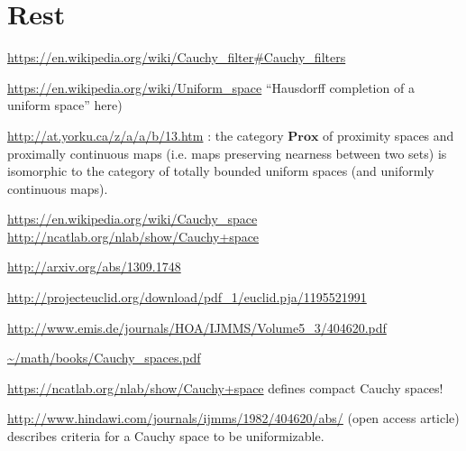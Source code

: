 \section{Rest}

\url{https://en.wikipedia.org/wiki/Cauchy\_filter\#Cauchy\_filters}

\url{https://en.wikipedia.org/wiki/Uniform\_space} ``Hausdorff completion of a
uniform space'' here)

\url{http://at.yorku.ca/z/a/a/b/13.htm} : the category $\mathbf{Prox}$ of proximity
spaces and proximally continuous maps (i.e. maps preserving nearness between
two sets) is isomorphic to the category of totally bounded uniform spaces (and
uniformly continuous maps).

\url{https://en.wikipedia.org/wiki/Cauchy\_space}
\url{http://ncatlab.org/nlab/show/Cauchy+space}

\url{http://arxiv.org/abs/1309.1748}

\url{http://projecteuclid.org/download/pdf\_1/euclid.pja/1195521991}

\url{http://www.emis.de/journals/HOA/IJMMS/Volume5\_3/404620.pdf}

\url{\~/math/books/Cauchy\_spaces.pdf}

\url{https://ncatlab.org/nlab/show/Cauchy+space} defines compact Cauchy spaces!

\url{http://www.hindawi.com/journals/ijmms/1982/404620/abs/} (open access article) describes criteria for a Cauchy space to be uniformizable.